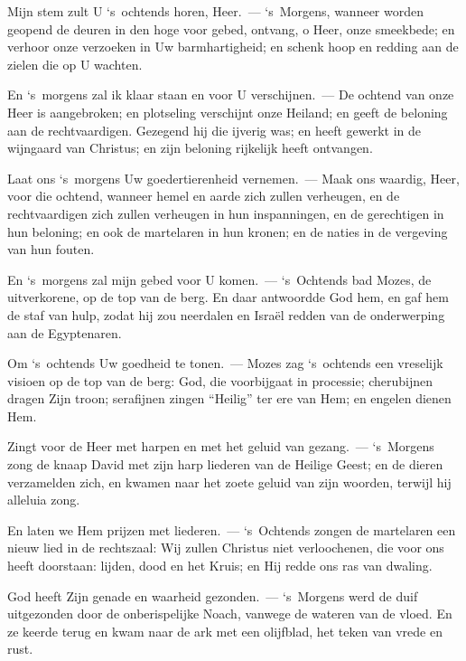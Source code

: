 \documentclass[12pt,twoside,a5paper]{article}
\begin{document}



\begin{halfparskip}
  Mijn stem zult U `s~ochtends horen, Heer.~--- `s~Morgens, wanneer worden geopend de deuren in den hoge voor gebed, ontvang, o Heer, onze smeekbede; en verhoor onze verzoeken in Uw barmhartigheid; en schenk hoop en redding aan de zielen die op U wachten.

  En `s~morgens zal ik klaar staan en voor U verschijnen.~--- De ochtend van onze Heer is aangebroken; en plotseling verschijnt onze Heiland; en geeft de beloning aan de rechtvaardigen. Gezegend hij die ijverig was; en heeft gewerkt in de wijngaard van Christus; en zijn beloning rijkelijk heeft ontvangen.

  Laat ons `s~morgens Uw goedertierenheid vernemen.~--- Maak ons waardig, Heer, voor die ochtend, wanneer hemel en aarde zich zullen verheugen, en de rechtvaardigen zich zullen verheugen in hun inspanningen, en de gerechtigen in hun beloning; en ook de martelaren in hun kronen; en de naties in de vergeving van hun fouten.

  En `s~morgens zal mijn gebed voor U komen.~--- `s~Ochtends bad Mozes, de uitverkorene, op de top van de berg. En daar antwoordde God hem, en gaf hem de staf van hulp, zodat hij zou neerdalen en Israël redden van de onderwerping aan de Egyptenaren.

  Om `s~ochtends Uw goedheid te tonen.~--- Mozes zag `s~ochtends een vreselijk visioen op de top van de berg: God, die voorbijgaat in processie; cherubijnen dragen Zijn troon; serafijnen zingen ``Heilig'' ter ere van Hem; en engelen dienen Hem.

  Zingt voor de Heer met harpen en met het geluid van gezang.~--- `s~Morgens zong de knaap David met zijn harp liederen van de Heilige Geest; en de dieren verzamelden zich, en kwamen naar het zoete geluid van zijn woorden, terwijl hij alleluia zong.

  En laten we Hem prijzen met liederen.~--- `s~Ochtends zongen de martelaren een nieuw lied in de rechtszaal: Wij zullen Christus niet verloochenen, die voor ons heeft doorstaan: lijden, dood en het Kruis; en Hij redde ons ras van dwaling.

  God heeft Zijn genade en waarheid gezonden.~--- `s~Morgens werd de duif uitgezonden door de onberispelijke Noach, vanwege de wateren van de vloed. En ze keerde terug en kwam naar de ark met een olijfblad, het teken van vrede en rust.


\end{halfparskip}
\end{document}
